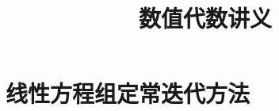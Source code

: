 \documentclass{book}
\begin{document}
\title{数值代数讲义}
\maketitle

\chapter{线性方程组定常迭代方法}


\cite{stein2003}


\end{document}
